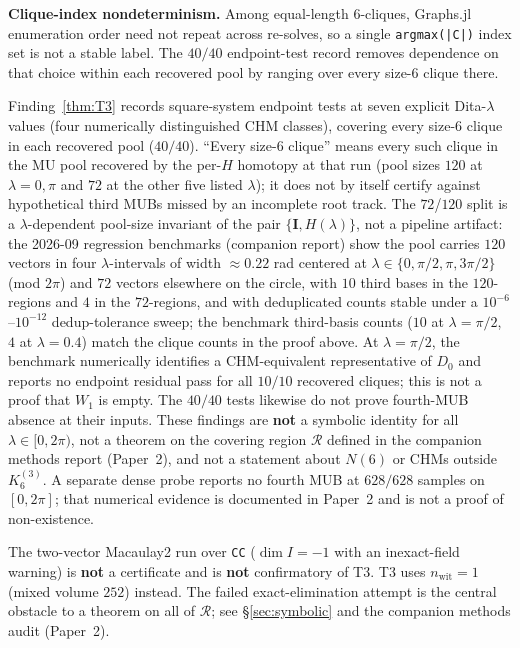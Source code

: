 \textbf{Clique-index nondeterminism.}
Among equal-length $6$-cliques, Graphs.jl enumeration order need not repeat across re-solves, so a single \texttt{argmax(|C|)} index set is not a stable label.
The $40/40$ endpoint-test record removes dependence on that choice within each recovered pool by ranging over every size-$6$ clique there.

\begin{remark}
Finding~\ref{thm:T3} records square-system endpoint tests at seven explicit Dita-$\lambda$ values (four numerically distinguished CHM classes), covering every size-$6$ clique in each recovered pool ($40/40$).
``Every size-$6$ clique'' means every such clique in the MU pool recovered by the per-$H$ homotopy at that run (pool sizes $120$ at $\lambda{=}0,\pi$ and $72$ at the other five listed $\lambda$); it does not by itself certify against hypothetical third MUBs missed by an incomplete root track.
The $72$/$120$ split is a $\lambda$-dependent pool-size invariant of the pair $\{\mathbf{I},H(\lambda)\}$, not a pipeline artifact: the 2026-09 regression benchmarks (companion report) show the pool carries $120$ vectors in four $\lambda$-intervals of width ${\approx}0.22$ rad centered at $\lambda\in\{0,\pi/2,\pi,3\pi/2\}$ (mod $2\pi$) and $72$ vectors elsewhere on the circle, with $10$ third bases in the $120$-regions and $4$ in the $72$-regions, and with deduplicated counts stable under a $10^{-6}$--$10^{-12}$ dedup-tolerance sweep; the benchmark third-basis counts ($10$ at $\lambda{=}\pi/2$, $4$ at $\lambda{=}0.4$) match the clique counts in the proof above.
At $\lambda{=}\pi/2$, the benchmark numerically identifies a CHM-equivalent representative of $D_0$ and reports no endpoint residual pass for all $10/10$ recovered cliques; this is not a proof that $W_1$ is empty. The $40/40$ tests likewise do not prove fourth-MUB absence at their inputs.
These findings are \textbf{not} a symbolic identity for all $\lambda\in[0,2\pi)$, not a theorem on the covering region $\mathcal{R}$ defined in the companion methods report (Paper~2), and not a statement about $N(6)$ or CHMs outside $K_6^{(3)}$.
A separate dense probe reports no fourth MUB at $628/628$ samples on $[0,2\pi]$; that numerical evidence is documented in Paper~2 and is not a proof of non-existence.
\end{remark}

\begin{remark}\label{rem:m2-inexact}
The two-vector Macaulay2 run over \texttt{CC} ($\dim I=-1$ with an inexact-field warning) is \textbf{not} a certificate and is \textbf{not} confirmatory of T3.
T3 uses $n_{\mathrm{wit}}=1$ (mixed volume $252$) instead.
The failed exact-elimination attempt is the central obstacle to a theorem on all of $\mathcal{R}$; see \S\ref{sec:symbolic} and the companion methods audit (Paper~2).
\end{remark}

